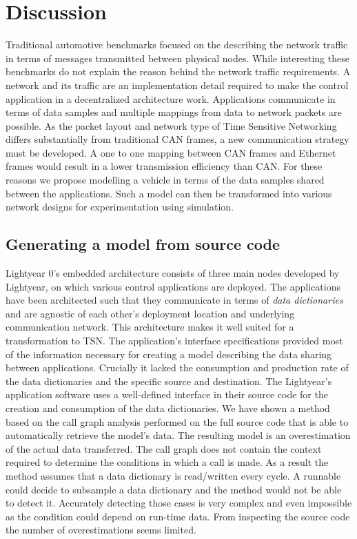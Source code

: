 \section{Discussion}
\label{sec:discussion}
Traditional automotive benchmarks focused on the describing the network traffic in terms of messages transmitted between physical nodes. While interesting these benchmarks do not explain the reason behind the network traffic requirements. A network and its traffic are an implementation detail required to make the control application in a decentralized architecture work. Applications communicate in terms of data samples and multiple mappings from data to network packets are possible. As the packet layout and network type of Time Sensitive Networking differs substantially from traditional CAN frames, a new communication strategy must be developed. A one to one mapping between CAN frames and Ethernet frames would result in a lower transmission efficiency than CAN. For these reasons we propose modelling a vehicle in terms of the data samples shared between the applications. Such a model can then be transformed into various network designs for experimentation using simulation.

\subsection{Generating a model from source code}
Lightyear 0's embedded architecture consists of three main nodes developed by Lightyear, on which various control applications are deployed. The applications have been architected such that they communicate in terms of \textit{data dictionaries} and are agnostic of each other's deployment location and underlying communication network. This architecture makes it well suited for a transformation to TSN. The application's interface specifications provided most of the information necessary for creating a model describing the data sharing between applications. Crucially it lacked the consumption and production rate of the data dictionaries and the specific source and destination. The Lightyear's application software uses a well-defined interface in their source code for the creation and consumption of the data dictionaries. We have shown a method based on the call graph analysis performed on the full source code that is able to automatically retrieve the model's data. The resulting model is an overestimation of the actual data transferred. The call graph does not contain the context required to determine the conditions in which a call is made. As a result the method assumes that a data dictionary is read/written every cycle. A runnable could decide to subsample a data dictionary and the method would not be able to detect it. Accurately detecting those cases is very complex and even impossible as the condition could depend on run-time data. From inspecting the source code the number of overestimations seems limited. 

